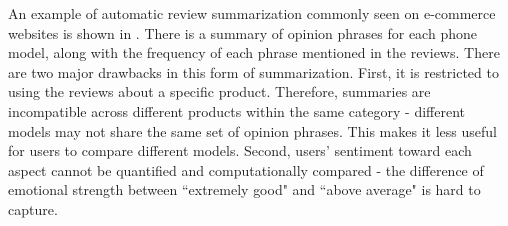 An example of automatic review summarization commonly seen 
on e-commerce websites is shown in . 
There is a summary of opinion phrases for each phone model, 
along with the frequency of each phrase mentioned in the 
reviews. There are two major drawbacks in this form of summarization. 
First, it is restricted to using the reviews about a specific product. 
Therefore, summaries are incompatible across different products within 
the same category - different models may not share the same set of 
opinion phrases. This makes it less useful for users to compare
different models.  Second, users' sentiment toward 
each aspect cannot be quantified and computationally compared - 
the difference of emotional strength between 
``extremely good" and ``above average" is hard to capture.

%

